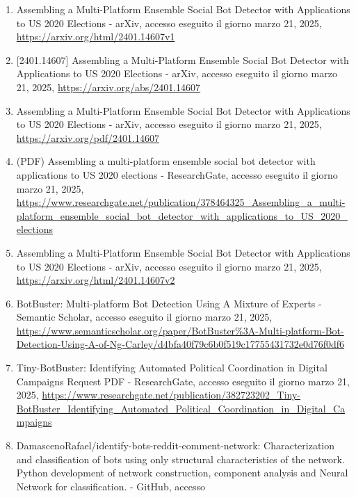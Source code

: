 \documentclass[
  12pt,
  letterpaper,
  DIV=11,
  numbers=noendperiod]{scrartcl}
\begin{document}
\begin{enumerate}
\item
  Assembling a Multi-Platform Ensemble Social Bot Detector with
  Applications to US 2020 Elections - arXiv, accesso eseguito il giorno
  marzo 21, 2025, \url{https://arxiv.org/html/2401.14607v1}\\
\item
  {[}2401.14607{]} Assembling a Multi-Platform Ensemble Social Bot
  Detector with Applications to US 2020 Elections - arXiv, accesso
  eseguito il giorno marzo 21, 2025,
  \url{https://arxiv.org/abs/2401.14607}\\
\item
  Assembling a Multi-Platform Ensemble Social Bot Detector with
  Applications to US 2020 Elections - arXiv, accesso eseguito il giorno
  marzo 21, 2025, \url{https://arxiv.org/pdf/2401.14607}\\
\item
  (PDF) Assembling a multi-platform ensemble social bot detector with
  applications to US 2020 elections - ResearchGate, accesso eseguito il
  giorno marzo 21, 2025,
  \url{https://www.researchgate.net/publication/378464325_Assembling_a_multi-platform_ensemble_social_bot_detector_with_applications_to_US_2020_elections}\\
\item
  Assembling a Multi-Platform Ensemble Social Bot Detector with
  Applications to US 2020 Elections - arXiv, accesso eseguito il giorno
  marzo 21, 2025, \url{https://arxiv.org/html/2401.14607v2}\\
\item
  BotBuster: Multi-platform Bot Detection Using A Mixture of Experts -
  Semantic Scholar, accesso eseguito il giorno marzo 21, 2025,
  \url{https://www.semanticscholar.org/paper/BotBuster\%3A-Multi-platform-Bot-Detection-Using-A-of-Ng-Carley/d4bfa40f79c6b0f519c17755431732e0d76f0df6}\\
\item
  Tiny-BotBuster: Identifying Automated Political Coordination in
  Digital Campaigns \textbar{} Request PDF - ResearchGate, accesso
  eseguito il giorno marzo 21, 2025,
  \url{https://www.researchgate.net/publication/382723202_Tiny-BotBuster_Identifying_Automated_Political_Coordination_in_Digital_Campaigns}\\
\item
  DamascenoRafael/identify-bots-reddit-comment-network: Characterization
  and classification of bots using only structural characteristics of
  the network. Python development of network construction, component
  analysis and Neural Network for classification. - GitHub, accesso

\end{enumerate}
\end{document}

